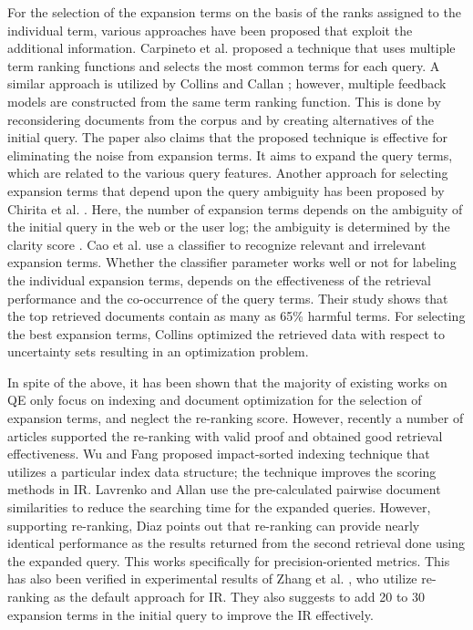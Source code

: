 For the selection of the expansion terms on the basis of the ranks assigned to the individual term, various approaches have been proposed that exploit the additional information. Carpineto et al. \cite{carpineto2002improving} proposed a technique that uses multiple term ranking functions and selects the most common terms for each query. A similar approach is utilized by Collins and Callan \cite{collins2007estimation}; however, multiple feedback models are constructed from the same term ranking function. This is done by reconsidering documents from the corpus and by creating alternatives of the initial query. The paper also claims that the proposed technique is effective for eliminating the noise from expansion terms. It aims to expand the query terms, which are related to the various query features. Another approach for selecting expansion terms that depend upon the query ambiguity has been proposed by Chirita et al. \cite{chirita2007personalized}. Here, the number of expansion terms depends on the ambiguity of the initial query in the web or the user log; the ambiguity is determined by the clarity score \cite{cronen2002predicting}. Cao et al. \cite{cao2008selecting} use a classifier to recognize relevant and irrelevant expansion terms. Whether the classifier parameter works well or not for labeling the individual expansion terms, depends on the effectiveness of the retrieval performance and the co-occurrence of the query terms. Their study shows that the top retrieved documents contain as many as 65\% harmful terms. For selecting the best expansion terms, Collins  \cite{collins2009reducing} optimized the retrieved data  with respect to uncertainty sets resulting in an optimization problem.

In spite of the above, it has been shown that the majority of existing works on QE \cite{lavrenko2006real,wu2013incremental} only focus on indexing and document optimization for the selection of expansion terms, and neglect the re-ranking score. However, recently a number of  articles \cite{diaz2015condensed,zhang2016learning} supported the re-ranking with valid proof and obtained good retrieval effectiveness. Wu and Fang \cite{wu2013incremental} proposed impact-sorted indexing technique that utilizes a particular index data structure; the technique improves the scoring methods in IR. Lavrenko and Allan \cite{lavrenko2006real} use the pre-calculated pairwise document similarities to reduce the searching time for the expanded queries. However, supporting re-ranking, Diaz \cite{diaz2015condensed} points out that re-ranking can provide nearly identical performance as the results returned from the second retrieval done using the expanded query. This works specifically for precision-oriented metrics. This has also been verified in experimental results of Zhang et al. \cite{zhang2016learning}, who utilize re-ranking as the default approach for IR. They also suggests to add 20 to 30 expansion terms in the initial query to improve the IR effectively.  

